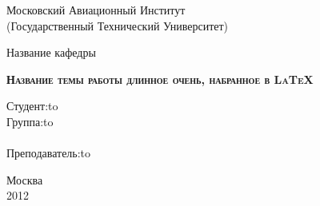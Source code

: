 \begin{titlepage}
\newpage

\begin{center}
Московский Авиационный Институт\\
(Государственный Технический Университет)
\end{center}

\vspace{2em}


\vspace{2em}

\begin{center}
\Large Название кафедры \\ 
\end{center}

\vspace{2em}

\begin{center}
\textsc{\textbf{Название темы работы \linebreak длинное очень, набранное в \LaTeX{}}}
\end{center}

\vspace{6em}

\newbox{\lbox}
\newlength{\maxl}
\setlength{\maxl}{\wd\lbox}
\hfill\parbox{11cm}{
\hspace*{5cm}\hspace*{-5cm}Студент:\hfill\hbox to\\
\hspace*{5cm}\hspace*{-5cm}Группа:\hfill\hbox to\\
\\
\hspace*{5cm}\hspace*{-5cm}Преподаватель:\hfill\hbox to\\
}

\vspace{\fill}

\begin{center}
Москва \\
2012
\end{center}

\end{titlepage}
